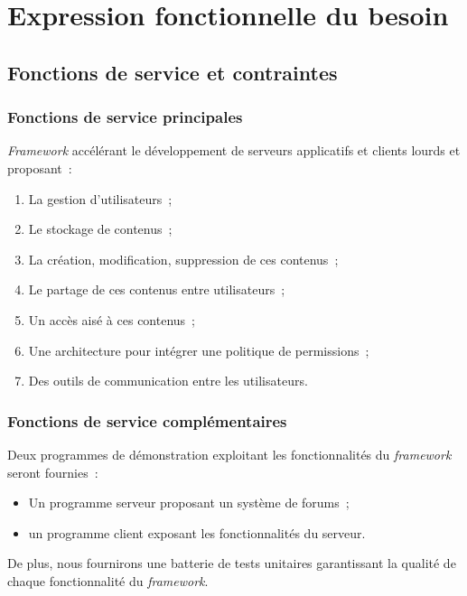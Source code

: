 
\section{Expression fonctionnelle du besoin}

\subsection{Fonctions de service et contraintes}

\subsubsection{Fonctions de service principales}

\emph{Framework} accélérant le développement de serveurs applicatifs et clients lourds et proposant~:

\begin{enumerate}
	\item La gestion d'utilisateurs~;
	\item Le stockage de contenus~;
	\item La création, modification, suppression de ces contenus~;
	\item Le partage de ces contenus entre utilisateurs~;
	\item Un accès aisé à ces contenus~;
	\item Une architecture pour intégrer une politique de permissions~;
	\item Des outils de communication entre les utilisateurs.
\end{enumerate}

\subsubsection{Fonctions de service complémentaires}

Deux programmes de démonstration exploitant les fonctionnalités du \emph{framework} seront fournies~:

\begin{itemize}
 \item Un programme serveur proposant un système de forums~;
 \item un programme client exposant les fonctionnalités du serveur.

\end{itemize}

De plus, nous fournirons une batterie de tests unitaires garantissant la qualité de chaque fonctionnalité du \emph{framework}.

